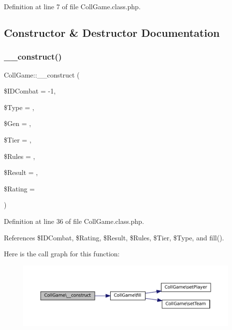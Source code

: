 Definition at line 7 of file Coll\+Game.\+class.\+php.



\subsection{Constructor \& Destructor Documentation}
\mbox{\label{class_coll_game_a4e0b87158815fece62aeb905f8b422bf}} 
\subsubsection{\texorpdfstring{\+\_\+\+\_\+construct()}{\_\_construct()}}
{\footnotesize\ttfamily Coll\+Game\+::\+\_\+\+\_\+construct (\begin{DoxyParamCaption}\item[{}]{\$\+I\+D\+Combat = {\ttfamily -\/1},  }\item[{}]{\$\+Type = {\ttfamily \textquotesingle{}\textquotesingle{}},  }\item[{}]{\$\+Gen = {\ttfamily \textquotesingle{}\textquotesingle{}},  }\item[{}]{\$\+Tier = {\ttfamily \textquotesingle{}\textquotesingle{}},  }\item[{}]{\$\+Rules = {\ttfamily \textquotesingle{}\textquotesingle{}},  }\item[{}]{\$\+Result = {},  }\item[{}]{\$\+Rating = {\ttfamily \textquotesingle{}\textquotesingle{}} }\end{DoxyParamCaption})}



Definition at line 36 of file Coll\+Game.\+class.\+php.



References \$\+I\+D\+Combat, \$\+Rating, \$\+Result, \$\+Rules, \$\+Tier, \$\+Type, and fill().

Here is the call graph for this function\+:\nopagebreak
\begin{figure}[H]
\begin{center}
\leavevmode
\includegraphics[width=350pt]{class_coll_game_a4e0b87158815fece62aeb905f8b422bf_cgraph}
\end{center}
\end{figure}
\mbox{\label{class_coll_game_aa97b1484a6cab9ad7acdf2a344b2fde7}} 

